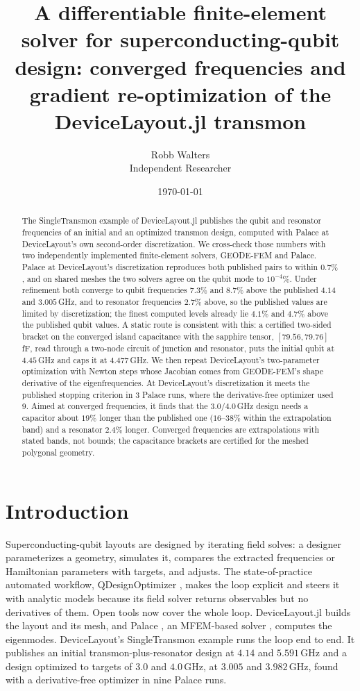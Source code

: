 \documentclass{anvil-paper}
\title{A differentiable finite-element solver for superconducting-qubit
design: converged frequencies and gradient re-optimization of the
DeviceLayout.jl transmon}
\author{Robb Walters\\
  {\normalsize Independent Researcher}}
\date{\today}
\begin{document}
\maketitle

\begin{abstract}
The SingleTransmon example of DeviceLayout.jl publishes the qubit and
resonator frequencies of an initial and an optimized transmon design,
computed with Palace at DeviceLayout's own second-order discretization. We
cross-check those numbers with two independently implemented
finite-element solvers, GEODE-FEM and Palace. Palace at DeviceLayout's
discretization reproduces both published pairs to within $0.7\%$, and on
shared meshes the two solvers agree on the qubit mode to $10^{-4}\%$.
Under refinement both converge to qubit frequencies $7.3\%$ and $8.7\%$
above the published $4.14$ and $3.005$\,GHz, and to resonator frequencies
$2.7\%$ above, so the published values are limited by discretization;
the finest computed levels already lie $4.1\%$ and $4.7\%$ above the
published qubit values. A static route is consistent with this: a
certified two-sided bracket on the converged island capacitance with the
sapphire tensor, $[79.56, 79.76]$\,fF, read through a two-node circuit of
junction and resonator, puts the initial qubit at $4.45$\,GHz and caps it
at $4.477$\,GHz. We then repeat DeviceLayout's
two-parameter optimization with Newton steps whose Jacobian comes from
GEODE-FEM's shape derivative of the eigenfrequencies. At DeviceLayout's
discretization it meets the published stopping criterion in 3 Palace runs,
where the derivative-free optimizer used 9. Aimed at converged frequencies,
it finds that the $3.0$/$4.0$\,GHz design needs a capacitor about $19\%$
longer than the published one ($16$--$38\%$ within the extrapolation band)
and a resonator $2.4\%$ longer. Converged frequencies are extrapolations
with stated bands, not bounds; the capacitance brackets are certified for
the meshed polygonal geometry.
\end{abstract}

\section{Introduction}
\label{sec:intro}

Superconducting-qubit layouts are designed by iterating field solves: a
designer parameterizes a geometry, simulates it, compares the extracted
frequencies or Hamiltonian parameters with targets, and adjusts. The
state-of-practice automated workflow, QDesignOptimizer
\citep{eriksson2025automated}, makes the loop explicit and steers it with
analytic models because its field solver returns observables but no
derivatives of them. Open tools now cover the whole loop.
DeviceLayout.jl \citep{devicelayout} builds the layout and its mesh, and
Palace \citep{palace}, an MFEM-based solver \citep{mfem,andrej2024high},
computes the eigenmodes. DeviceLayout's SingleTransmon example
\citep{devicelayout-blog,devicelayout-example} runs the loop end to end.
It publishes an initial transmon-plus-resonator design at $4.14$ and
$5.591$\,GHz and a design optimized to targets of $3.0$ and $4.0$\,GHz, at
$3.005$ and $3.982$\,GHz, found with a derivative-free optimizer in nine
Palace runs.
\end{document}
